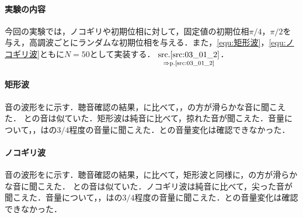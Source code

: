 \paragraph{実験の内容}今回の実験では，ノコギリや初期位相に対して，固定値の初期位相\(\pi/4\)，\(\pi/2\)を与え，高調波ごとにランダムな初期位相を与える．また，\eqref{equ:矩形波}，\eqref{equ:ノコギリ波}ともに\(N=50\)として実装する．
\(\underset{\Rightarrow\textrm{p.\pageref{src:03_01_2}}}{\textrm{\srcref{src:03_01_2}}}\)．
\result
\paragraph{矩形波}
音の波形をに示す．聴音確認の結果，に比べて，，の方が滑らかな音に聞こえた．
との音は似ていた．矩形波は純音に比べて，掠れた音が聞こえた．音量について，，はの\(3/4\)程度の音量に聞こえた．との音量変化は確認できなかった．
\paragraph{ノコギリ波}
音の波形をに示す．聴音確認の結果，に比べて，矩形波と同様に，の方が滑らかな音に聞こえた．
との音は似ていた．ノコギリ波は純音に比べて，尖った音が聞こえた．音量について，，はの\(3/4\)程度の音量に聞こえた．との音量変化は確認できなかった．
